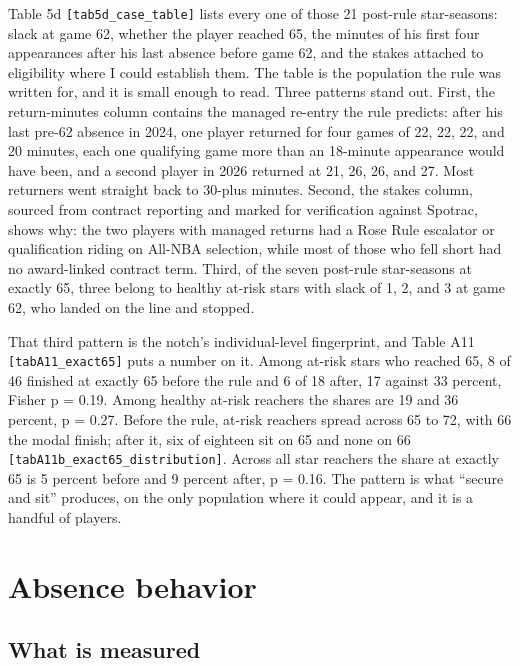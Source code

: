 \documentclass[11pt]{article}
\begin{document}
Table 5d {\small\texttt{[tab5d\_case\_table]}} lists every one of those 21 post-rule star-seasons: slack at game 62, whether the player reached 65, the minutes of his first four appearances after his last absence before game 62, and the stakes attached to eligibility where I could establish them. The table is the population the rule was written for, and it is small enough to read. Three patterns stand out. First, the return-minutes column contains the managed re-entry the rule predicts: after his last pre-62 absence in 2024, one player returned for four games of 22, 22, 22, and 20 minutes, each one qualifying game more than an 18-minute appearance would have been, and a second player in 2026 returned at 21, 26, 26, and 27. Most returners went straight back to 30-plus minutes. Second, the stakes column, sourced from contract reporting and marked for verification against Spotrac, shows why: the two players with managed returns had a Rose Rule escalator or qualification riding on All-NBA selection, while most of those who fell short had no award-linked contract term. Third, of the seven post-rule star-seasons at exactly 65, three belong to healthy at-risk stars with slack of 1, 2, and 3 at game 62, who landed on the line and stopped.

That third pattern is the notch's individual-level fingerprint, and Table A11 {\small\texttt{[tabA11\_exact65]}} puts a number on it. Among at-risk stars who reached 65, 8 of 46 finished at exactly 65 before the rule and 6 of 18 after, 17 against 33 percent, Fisher p = 0.19. Among healthy at-risk reachers the shares are 19 and 36 percent, p = 0.27. Before the rule, at-risk reachers spread across 65 to 72, with 66 the modal finish; after it, six of eighteen sit on 65 and none on 66 {\small\texttt{[tabA11b\_exact65\_distribution]}}. Across all star reachers the share at exactly 65 is 5 percent before and 9 percent after, p = 0.16. The pattern is what ``secure and sit'' produces, on the only population where it could appear, and it is a handful of players.


\section{Absence behavior}



\subsection*{What is measured}
\end{document}
